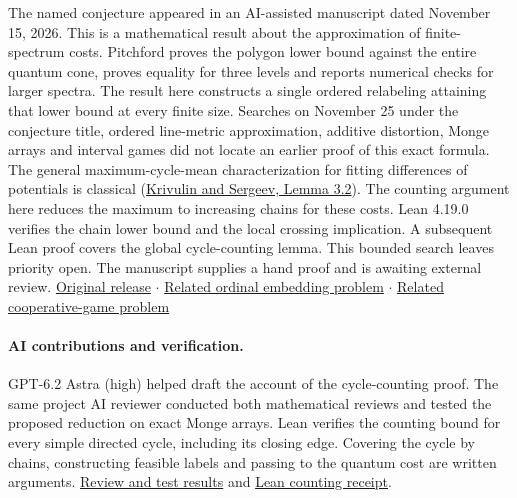 \documentclass[11pt]{article}
\begin{document}
The named conjecture appeared in an AI-assisted manuscript dated November 15, 2026. This is a mathematical result about the approximation of finite-spectrum costs. Pitchford proves the polygon lower bound against the entire quantum cone, proves equality for three levels and reports numerical checks for larger spectra. The result here constructs a single ordered relabeling attaining that lower bound at every finite size. Searches on November 25 under the conjecture title, ordered line-metric approximation, additive distortion, Monge arrays and interval games did not locate an earlier proof of this exact formula. The general maximum-cycle-mean characterization for fitting differences of potentials is classical (\href{https://arxiv.org/abs/1802.01989}{Krivulin and Sergeev, Lemma 3.2}). The counting argument here reduces the maximum to increasing chains for these costs. Lean 4.19.0 verifies the chain lower bound and the local crossing implication. A subsequent Lean proof covers the global cycle-counting lemma. This bounded search leaves priority open. The manuscript supplies a hand proof and is awaiting external review. \href{https://www.evidencepress.org/releases/quantum-transport-cost-cones/}{Original release} \ensuremath{\cdot} \href{https://people.csail.mit.edu/edemaine/papers/Ordinal_TAlg/paper.pdf}{Related ordinal embedding problem} \ensuremath{\cdot} \href{https://web.mit.edu/schulz/www/epapers/su-do-2013.pdf}{Related cooperative-game problem}
\paragraph{AI contributions and verification.} GPT-6.2 Astra (high) helped draft the account of the cycle-counting proof. The same project AI reviewer conducted both mathematical reviews and tested the proposed reduction on exact Monge arrays. Lean verifies the counting bound for every simple directed cycle, including its closing edge. Covering the cycle by chains, constructing feasible labels and passing to the quantum cost are written arguments. \href{https://github.com/shunyaekam/oo-research/blob/a5cde30636afbfe599efab6bf8bbbafe9c640c22/checks/transport-reaudit.md}{Review and test results} and \href{https://github.com/shunyaekam/oo-research/blob/a5cde30636afbfe599efab6bf8bbbafe9c640c22/formal/transport_literal/counting-receipt.json}{Lean counting receipt}.
\end{document}
